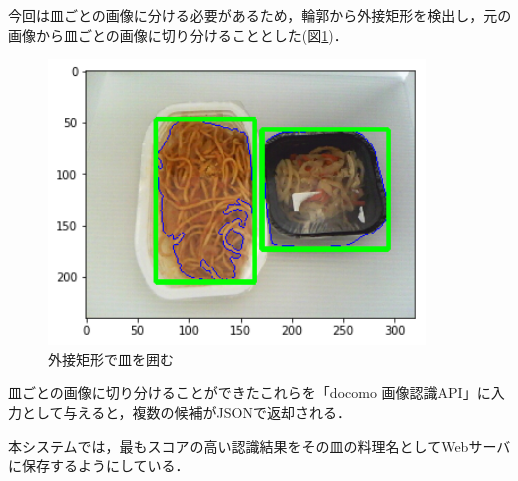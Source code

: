 \documentclass[../report]{subfiles}
\begin{document}
今回は皿ごとの画像に分ける必要があるため，輪郭から外接矩形を検出し，元の画像から皿ごとの画像に切り分けることとした(図\ref{fig:6-bounding})．

\begin{figure}[htbp]
    \begin{center}
        \includegraphics[width=10cm]{imgs/6-bounding.png}
        \caption{外接矩形で皿を囲む}
        \label{fig:6-bounding}
    \end{center}
\end{figure}

皿ごとの画像に切り分けることができたこれらを「docomo 画像認識API」に入力として与えると，複数の候補がJSONで返却される．

本システムでは，最もスコアの高い認識結果をその皿の料理名としてWebサーバに保存するようにしている．
\end{document}
